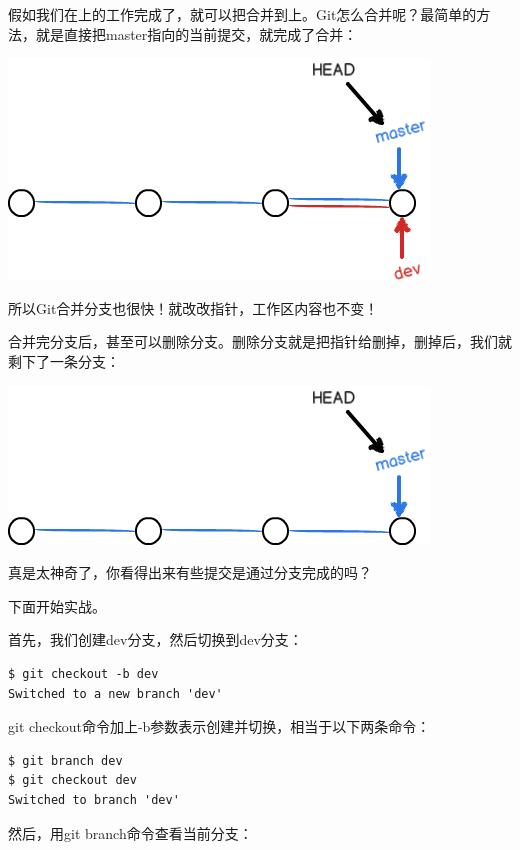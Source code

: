 \documentclass[•]{article}
\begin{document}
\begin{CJK}{UTF8}{gbsn}
\begin{center}
\end{center}
假如我们在上的工作完成了，就可以把合并到上。Git怎么合并呢？最简单的方法，就是直接把master指向的当前提交，就完成了合并：
\begin{center}
\includegraphics[scale=0.6]{head4.png}
\end{center}
所以Git合并分支也很快！就改改指针，工作区内容也不变！

合并完分支后，甚至可以删除分支。删除分支就是把指针给删掉，删掉后，我们就剩下了一条分支：
\begin{center}
\includegraphics[scale=0.6]{head5.png}
\end{center}
真是太神奇了，你看得出来有些提交是通过分支完成的吗？

下面开始实战。

首先，我们创建dev分支，然后切换到dev分支：

\begin{lstlisting}
$ git checkout -b dev
Switched to a new branch 'dev'
\end{lstlisting}

git checkout命令加上-b参数表示创建并切换，相当于以下两条命令：

\begin{lstlisting}
$ git branch dev
$ git checkout dev
Switched to branch 'dev'
\end{lstlisting}


然后，用git branch命令查看当前分支：


\end{CJK}
\end{document}
